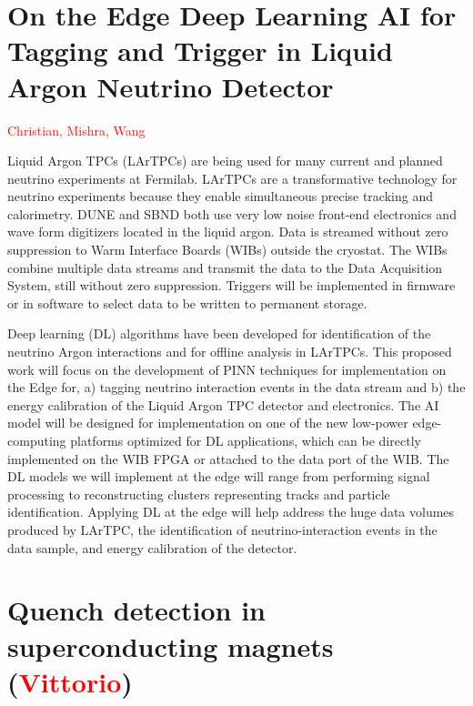 \section*{On the Edge Deep Learning AI for Tagging and Trigger in Liquid Argon Neutrino Detector}
\textcolor{red}{Christian, Mishra, Wang}

Liquid Argon TPCs (LArTPCs) are being used for many current and planned neutrino experiments at Fermilab. LArTPCs are a transformative technology for neutrino experiments because they enable simultaneous precise tracking and calorimetry. DUNE and SBND both use very low noise front-end electronics and wave form digitizers located in the liquid argon.  Data is streamed without zero suppression to Warm Interface Boards (WIBs) outside the cryostat.  The WIBs combine multiple data streams and transmit the data to the Data Acquisition System, still without zero suppression. Triggers will be implemented in firmware or in software to select data to be written to permanent storage.

Deep learning (DL) algorithms have been developed for identification of the neutrino Argon interactions and for offline analysis in LArTPCs. This proposed work will focus on the development of PINN techniques for implementation on the Edge for, a) tagging neutrino interaction events in the data stream and b) the energy calibration of the Liquid Argon TPC detector and electronics. The AI model will be designed for implementation on one of the new low-power edge-computing platforms optimized for DL applications, which can be directly implemented on the WIB FPGA or attached to the data port of the WIB. The DL models we will implement at the edge will range from performing signal processing to reconstructing clusters representing tracks and particle identification. Applying DL at the edge will help address the huge data volumes produced by LArTPC, the identification of neutrino-interaction events in the data sample, and energy calibration of the detector. 

\section*{Quench detection in superconducting magnets (\textcolor{red}{Vittorio})}

